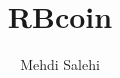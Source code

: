 \documentclass[conference, anonymous]{IEEEtran}
\begin{document}


\title{RBcoin}

\author{
Mehdi Salehi
}

\maketitle

\begin{abstract}

\end{abstract}




%
%
%
%




%
%
\end{document}
